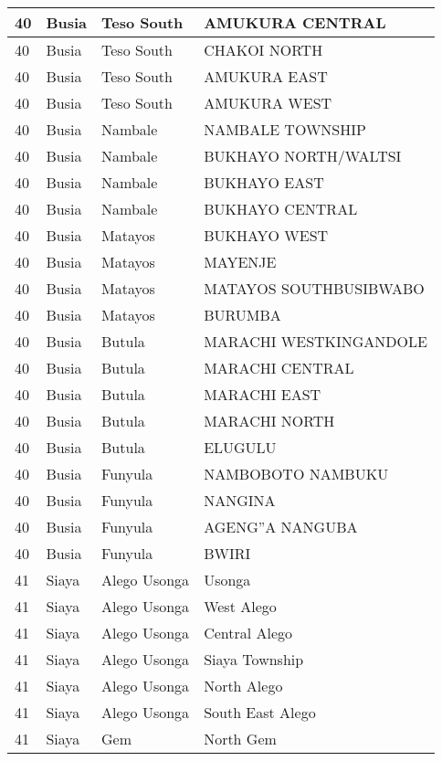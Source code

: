 \begin{table}[!ht]
\begin{tabular}{|l|l|l|l|}
        40 & Busia & Teso South & AMUKURA CENTRAL \\ \hline
        40 & Busia & Teso South & CHAKOI NORTH \\ \hline
        40 & Busia & Teso South & AMUKURA EAST \\ \hline
        40 & Busia & Teso South & AMUKURA WEST \\ \hline
        40 & Busia & Nambale & NAMBALE TOWNSHIP \\ \hline
        40 & Busia & Nambale & BUKHAYO NORTH/WALTSI \\ \hline
        40 & Busia & Nambale & BUKHAYO EAST \\ \hline
        40 & Busia & Nambale & BUKHAYO CENTRAL \\ \hline
        40 & Busia & Matayos & BUKHAYO WEST \\ \hline
        40 & Busia & Matayos & MAYENJE \\ \hline
        40 & Busia & Matayos & MATAYOS SOUTHBUSIBWABO \\ \hline
        40 & Busia & Matayos & BURUMBA \\ \hline
        40 & Busia & Butula & MARACHI WESTKINGANDOLE \\ \hline
        40 & Busia & Butula & MARACHI CENTRAL \\ \hline
        40 & Busia & Butula & MARACHI EAST \\ \hline
        40 & Busia & Butula & MARACHI NORTH \\ \hline
        40 & Busia & Butula & ELUGULU \\ \hline
        40 & Busia & Funyula & NAMBOBOTO NAMBUKU \\ \hline
        40 & Busia & Funyula & NANGINA \\ \hline
        40 & Busia & Funyula & AGENG''A NANGUBA \\ \hline
        40 & Busia & Funyula & BWIRI \\ \hline
        41 & Siaya & Alego Usonga & Usonga \\ \hline
        41 & Siaya & Alego Usonga & West Alego \\ \hline
        41 & Siaya & Alego Usonga & Central Alego \\ \hline
        41 & Siaya & Alego Usonga & Siaya Township \\ \hline
        41 & Siaya & Alego Usonga & North Alego \\ \hline
        41 & Siaya & Alego Usonga & South East Alego \\ \hline
        41 & Siaya & Gem & North Gem \\ \hline

\end{tabular}
\end{table}
